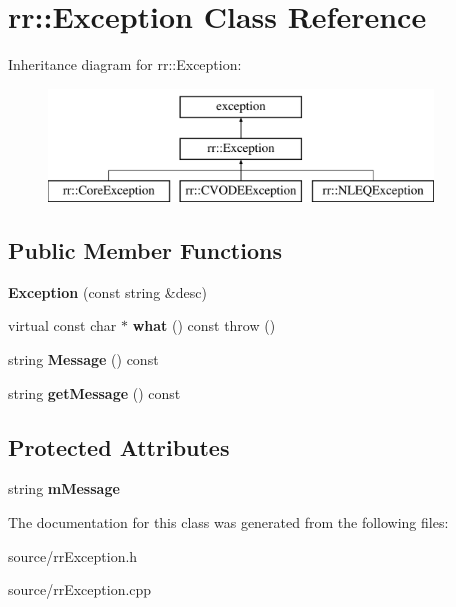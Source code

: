 \hypertarget{classrr_1_1_exception}{\section{rr\-:\-:Exception Class Reference}
\label{classrr_1_1_exception}
}
Inheritance diagram for rr\-:\-:Exception\-:\begin{figure}[H]
\begin{center}
\leavevmode
\includegraphics[height=3.000000cm]{classrr_1_1_exception}
\end{center}
\end{figure}
\subsection*{Public Member Functions}
\begin{DoxyCompactItemize}
\item 
\hypertarget{classrr_1_1_exception_a1eedd425af5fe42da04a373eaba4f63c}{{\bfseries Exception} (const string \&desc)}\label{classrr_1_1_exception_a1eedd425af5fe42da04a373eaba4f63c}

\item 
\hypertarget{classrr_1_1_exception_a1f34ebb35ae9b0cc8066b7b973b1c3a2}{virtual const char $\ast$ {\bfseries what} () const   throw ()}\label{classrr_1_1_exception_a1f34ebb35ae9b0cc8066b7b973b1c3a2}

\item 
\hypertarget{classrr_1_1_exception_affe28c5acce6e0e481d747f7798eb97a}{string {\bfseries Message} () const }\label{classrr_1_1_exception_affe28c5acce6e0e481d747f7798eb97a}

\item 
\hypertarget{classrr_1_1_exception_a297d246c83d1b5fc2fea62379e2dc139}{string {\bfseries get\-Message} () const }\label{classrr_1_1_exception_a297d246c83d1b5fc2fea62379e2dc139}

\end{DoxyCompactItemize}
\subsection*{Protected Attributes}
\begin{DoxyCompactItemize}
\item 
\hypertarget{classrr_1_1_exception_a6201902a23b56dab5704a726049a7908}{string {\bfseries m\-Message}}\label{classrr_1_1_exception_a6201902a23b56dab5704a726049a7908}

\end{DoxyCompactItemize}


The documentation for this class was generated from the following files\-:\begin{DoxyCompactItemize}
\item 
source/rr\-Exception.\-h\item 
source/rr\-Exception.\-cpp\end{DoxyCompactItemize}
